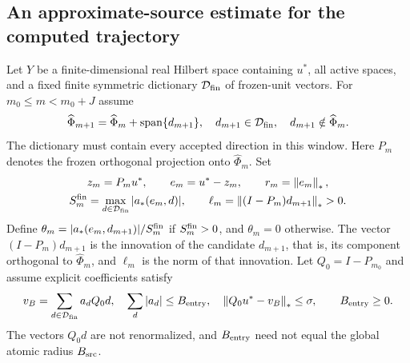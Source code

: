 \documentclass[11pt]{article}
\theoremstyle{remark}
\begin{document}
\subsection{An approximate-source estimate for the computed trajectory}
\label{sec:c5-source}

Let $Y$ be a finite-dimensional real Hilbert space containing $u^*$,
all active spaces, and a fixed finite symmetric dictionary
$\mathcal D_{\rm fin}$ of frozen-unit vectors. For $m_0\leq m<m_0+J$ assume
\begin{equation}
 \widehat\Phi_{m+1}=\widehat\Phi_m+\operatorname{span}\{d_{m+1}\},
 \quad d_{m+1}\in\mathcal D_{\rm fin},\quad d_{m+1}\notin\widehat\Phi_m .
 \label{eq:c5-spaces}
\end{equation}
The dictionary must contain every accepted direction in this window.
Here $P_m$ denotes the frozen orthogonal projection onto $\widehat\Phi_m$.
Set
\[
 \begin{gathered}
 z_m=P_mu^*,\qquad e_m=u^*-z_m,\qquad r_m=\left\lVert e_m\right\rVert_*,\\
 S_m^{\rm fin}=\max_{d\in\mathcal D_{\rm fin}}|a_*(e_m,d)|,\qquad
 \ell_m=\left\lVert(I-P_m)d_{m+1}\right\rVert_*>0 .
 \end{gathered}
\]
Define $\theta_m=|a_*(e_m,d_{m+1})|/S_m^{\rm fin}$ if
$S_m^{\rm fin}>0$, and $\theta_m=0$ otherwise.
The vector $(I-P_m)d_{m+1}$ is the innovation of the candidate
$d_{m+1}$, that is, its component orthogonal to $\widehat\Phi_m$, and
$\ell_m$ is the norm of that innovation.
Let $Q_0=I-P_{m_0}$ and assume explicit coefficients satisfy
\begin{equation}
 v_B=\sum_{d\in\mathcal D_{\rm fin}}a_dQ_0d,\quad
 \sum_d|a_d|\leq B_{\rm entry},\quad
 \left\lVert Q_0u^*-v_B\right\rVert_*\leq\sigma,\qquad B_{\rm entry}\geq0.
 \label{eq:c5-entry-source}
\end{equation}
The vectors $Q_0d$ are not renormalized, and $B_{\rm entry}$
need not equal the global atomic radius $B_{\rm src}$.
\end{document}
